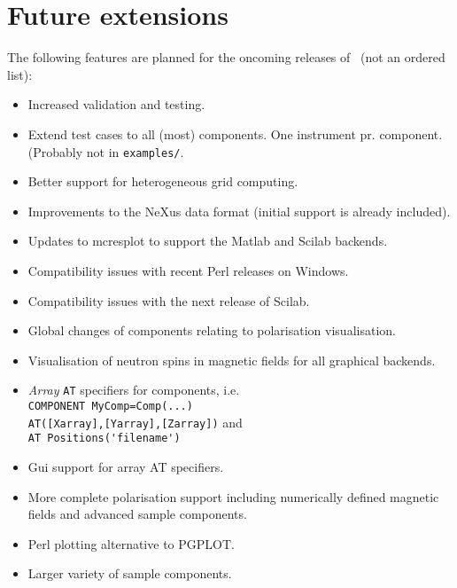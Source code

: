 \section{Future extensions}
\label{s:future}
The following features are planned for the oncoming releases of \MCS\
(not an ordered list):
\begin{itemize}
\item Increased validation and testing.
\item Extend test cases to all (most) components. One instrument
  pr. component. (Probably not in \verb+examples/+.
\item Better support for heterogeneous grid computing.
\item Improvements to the NeXus data format (initial support is
  already included).
\item Updates to mcresplot to support the Matlab and Scilab backends.
\item Compatibility issues with recent Perl releases on Windows.
\item Compatibility issues with the next release of Scilab.
\item Global changes of components relating to polarisation
  visualisation.
\item Visualisation of neutron spins in magnetic fields for all
  graphical backends.
\item \emph{Array} \verb+AT+ specifiers for components, i.e. \\
  \verb+COMPONENT MyComp=Comp(...)+\\\verb+AT([Xarray],[Yarray],[Zarray])+ and\\
  \verb+AT Positions('filename')+
\item Gui support for array AT specifiers.
\item More complete polarisation support including numerically defined
  magnetic fields and advanced sample components.
\item Perl plotting alternative to PGPLOT.
\item Larger variety of sample components.
\end{itemize}








